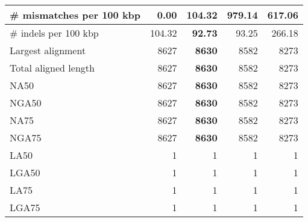\documentclass[12pt,a4paper]{article}
\begin{document}
\begin{table}[ht]
\begin{center}
\begin{tabular}{|l*{4}{|r}|}
\# mismatches per 100 kbp & {\bf 0.00} & 104.32 & 979.14 & 617.06 \\ \hline
\# indels per 100 kbp & 104.32 & {\bf 92.73} & 93.25 & 266.18 \\ \hline
Largest alignment & 8627 & {\bf 8630} & 8582 & 8273 \\ \hline
Total aligned length & 8627 & {\bf 8630} & 8582 & 8273 \\ \hline
NA50 & 8627 & {\bf 8630} & 8582 & 8273 \\ \hline
NGA50 & 8627 & {\bf 8630} & 8582 & 8273 \\ \hline
NA75 & 8627 & {\bf 8630} & 8582 & 8273 \\ \hline
NGA75 & 8627 & {\bf 8630} & 8582 & 8273 \\ \hline
LA50 & 1 & 1 & 1 & 1 \\ \hline
LGA50 & 1 & 1 & 1 & 1 \\ \hline
LA75 & 1 & 1 & 1 & 1 \\ \hline
LGA75 & 1 & 1 & 1 & 1 \\ \hline
\end{tabular}
\end{center}
\end{table}
\end{document}
